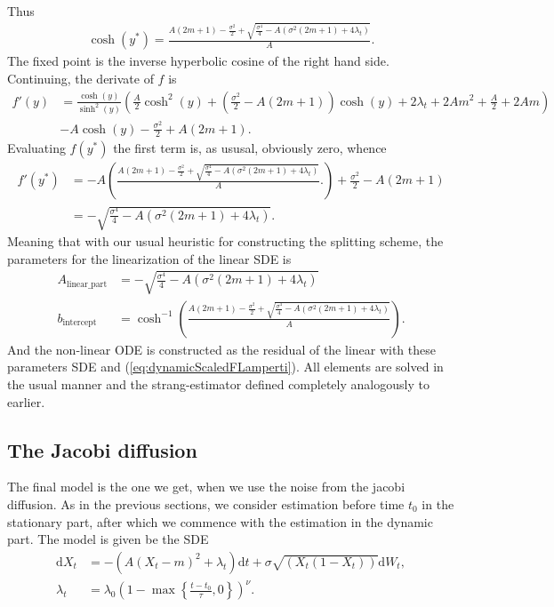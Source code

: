 Thus
\begin{align}
    \cosh(y^*) = \frac{A\left(2m + 1\right) - \frac{\sigma^2}{2} + \sqrt{\frac{\sigma^4}{4}-A\left(\sigma^2\left(2m + 1\right) + 4 \lambda_t\right)}}{A}.
\end{align}
The fixed point is the inverse hyperbolic cosine of the right hand side. Continuing, the derivate of $f$ is
\begin{align}
    f'(y) &= \frac{\cosh(y)}{\sinh^2\left(y\right)}\left(\frac{A}{2}\cosh^2\left(y\right) + \left(\frac{\sigma^2}{2} - A \left(2m + 1\right)\right)\cosh\left(y\right) + 2\lambda_t + 2Am^2 + \frac{A}{2} + 2Am\right) \nonumber\\
    &-A\cosh(y) - \frac{\sigma^2}{2} + A \left(2m + 1\right).
\end{align}
Evaluating $f(y^*)$ the first term is, as ususal, obviously zero, whence
\begin{align}
    f'(y^*) &= -A\left(\frac{A\left(2m + 1\right) - \frac{\sigma^2}{2} + \sqrt{\frac{\sigma^4}{4}-A\left(\sigma^2\left(2m + 1\right) + 4 \lambda_t\right)}}{A}.\right) + \frac{\sigma^2}{2} - A \left(2m + 1\right) \nonumber \\
    &= - \sqrt{\frac{\sigma^4}{4}-A\left(\sigma^2\left(2m + 1\right) + 4 \lambda_t\right)}.
\end{align}
Meaning that with our usual heuristic for constructing the splitting scheme, the parameters for the linearization of the linear SDE is
\begin{align}
    A_{\mathrm{linear\_part}} &= -\sqrt{\frac{\sigma^4}{4} - A \left(\sigma^2\left(2m + 1\right) + 4\lambda_t\right)}\\
    b_{\mathrm{intercept}} &= \cosh^{-1}\left(\frac{A\left(2m + 1\right) - \frac{\sigma^2}{2} + \sqrt{\frac{\sigma^4}{4}-A\left(\sigma^2\left(2m + 1\right) + 4 \lambda_t\right)}}{A}\right). \label{eq:FscaledSplitting}
\end{align}
And the non-linear ODE is constructed as the residual of the linear with these parameters SDE and (\ref{eq:dynamicScaledFLamperti}). All elements are solved in the usual manner and the strang-estimator defined completely analogously to earlier.\newpage
\subsection{The Jacobi diffusion}
The final model is the one we get, when we use the noise from the jacobi diffusion. As in the previous sections, we consider estimation before time $t_0$ in the stationary part, after which we commence with the estimation in the dynamic part. The model is given be the SDE
\begin{align}
    \mathrm{d}X_t &= -\left(A\left(X_t - m\right)^2 + \lambda_t\right)\mathrm{d}t + \sigma \sqrt{\left(X_t\left(1 - X_t\right)\right)} \mathrm{d}W_t,\\
    \lambda_t &= \lambda_0\left(1 - \max\left\{\frac{t - t_0}{\tau}, 0\right\}\right)^\nu.
\end{align}
